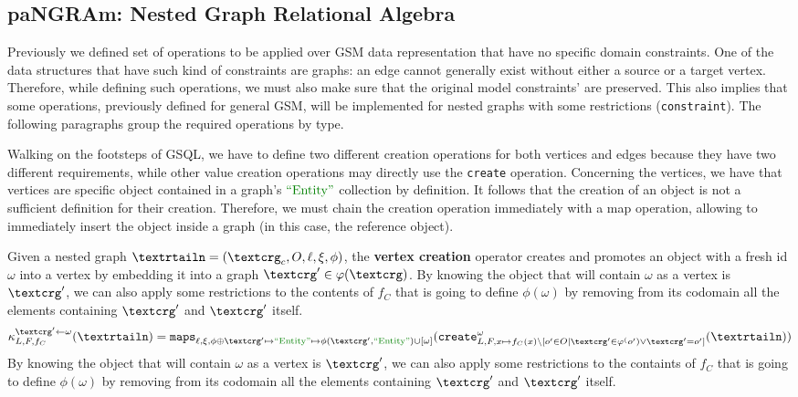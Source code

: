 \subsection{paNGRAm: Nested Graph Relational Algebra}\label{ssec:ngrahop}
Previously we defined set of operations to be applied over GSM data representation that have no specific domain constraints. One of the data structures that have such kind of constraints are graphs: an edge cannot generally exist without either a source or a target vertex. Therefore, while defining such operations, we must also make sure that the original model constraints' are preserved. This also implies that some operations, previously defined for general GSM, will be implemented for nested graphs with some restrictions (\texttt{constraint}). The following paragraphs group the required operations by type.

Walking on the footsteps of GSQL, we have to define two different   creation operations for both vertices and edges because they have two different requirements, while other value creation operations may directly use the \texttt{create} operation. Concerning the vertices, we have that vertices are specific object contained in a graph's $\ONTA$ collection by definition. It follows that the creation of an object is not a sufficient definition for their creation. Therefore, we must chain the creation operation immediately with a map operation, allowing to immediately insert the object inside a graph (in this case, the reference object).

\begin{definition}
	Given a nested graph $\nested=(\ngraph_c,O,\ell,\xi,\phi)$, the \textbf{vertex creation} operator creates and promotes an object with a fresh id $\omega$ into a vertex by embedding it into a graph $\ngraph'\in\varphi(\ngraph)$. By knowing the object that will contain $\omega$ as a vertex is $\ngraph'$, we can also apply some restrictions to the contents of $f_C$ that is going to define $\phi(\omega)$ by removing from its codomain all the elements containing $\ngraph'$ and $\ngraph'$ itself.
	\[\kappa^{\ngraph'\leftarrow \omega}_{L,F,f_C}(\nested)=\texttt{maps}_{\ell,\xi,\phi\oplus \ngraph'\mapsto\ONTA\mapsto \phi(\ngraph',\ONTA)\cup[\omega]}(\texttt{create}^\omega_{L,F,x\mapsto f_C(x)\backslash[o'\in O|\ngraph'\in \varphi^(o')\vee \ngraph'=o']}(\nested))\]
By knowing the object that will contain $\omega$ as a vertex is $\ngraph'$, we can also apply some restrictions to the containts of $f_C$ that is going to define $\phi(\omega)$ by removing from its codomain all the elements containing $\ngraph'$ and $\ngraph'$ itself.
\end{definition}

